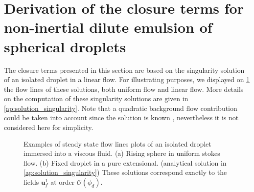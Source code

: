 \section{Derivation of the closure terms for non-inertial dilute emulsion of spherical droplets}
\label{sec:application}




The closure terms presented in this section are based on the singularity solution of an isolated droplet in a linear flow. 
For illustrating purposes, we displayed on \ref{fig:flowlines} the flow lines of these solutions, both uniform flow and linear flow. 
More details on the computation of these singularity solutions are given in \ref{ap:solution_singularity}. 
Note that a quadratic background flow contribution could be taken into account since the solution is known \citep{nadim1991motion}, nevertheless it is not considered here for simplicity. 
\begin{figure}[h!]
    \centering
    \caption{Examples of steady state flow lines plots of an isolated droplet immersed into a viscous fluid. 
    (a) Rising sphere in uniform stokes flow. 
    (b) Fixed droplet in a pure extensional.
    (analytical solution in \ref{ap:solution_singularity})
    These solutions correspond exactly to the fields $\textbf{u}_f^1$ at order $\mathcal{O}(\phi_d)$.}
    \label{fig:flowlines}
\end{figure}

